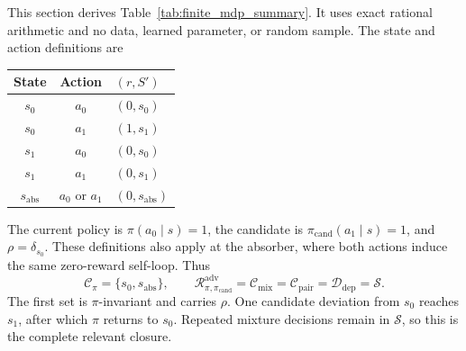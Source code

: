 \documentclass{article}
\theoremstyle{plain}
\theoremstyle{definition}
\theoremstyle{remark}
\begin{document}
This section derives Table~\ref{tab:finite_mdp_summary}. It uses exact
rational arithmetic and no data, learned parameter, or random sample. The
state and action definitions are
\begin{center}
\begin{tabular}{@{}ccl@{}}
\toprule
State & Action & $(r,S')$ \\
\midrule
$s_0$ & $a_0$ & $(0,s_0)$ \\
$s_0$ & $a_1$ & $(1,s_1)$ \\
$s_1$ & $a_0$ & $(0,s_0)$ \\
$s_1$ & $a_1$ & $(0,s_1)$ \\
$s_{\mathrm{abs}}$ & $a_0$ or $a_1$ & $(0,s_{\mathrm{abs}})$ \\
\bottomrule
\end{tabular}
\end{center}
The current policy is $\pi(a_0\mid s)=1$, the candidate is
$\pi_{\mathrm{cand}}(a_1\mid s)=1$, and $\rho=\delta_{s_0}$. These definitions
also apply at the absorber, where both actions induce the same zero-reward
self-loop. Thus
\[
\mathcal C_\pi=\{s_0,s_{\mathrm{abs}}\},\qquad
\mathcal R_{\pi,\pi_{\mathrm{cand}}}^{\mathrm{adv}}
=\mathcal C_{\mathrm{mix}}=\mathcal C_{\mathrm{pair}}
=\mathcal D_{\mathrm{dep}}=\mathcal S.
\]
The first set is $\pi$-invariant and carries $\rho$. One candidate deviation
from $s_0$ reaches $s_1$, after which $\pi$ returns to $s_0$. Repeated mixture
decisions remain in $\mathcal S$, so this is the complete relevant closure.
\end{document}
